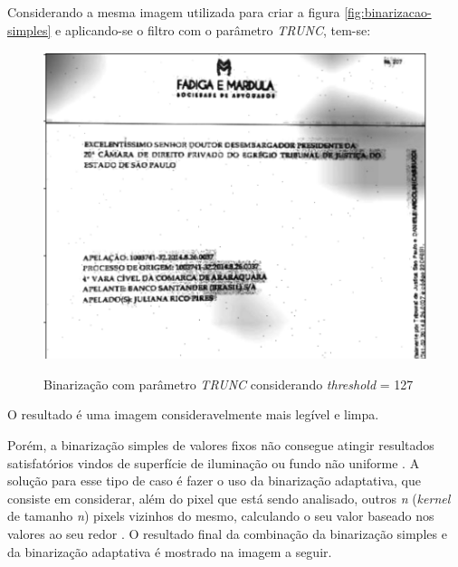 Considerando a mesma imagem utilizada para criar a figura \ref{fig:binarizacao-simples} e aplicando-se o filtro com o parâmetro \textit{TRUNC}, tem-se:

\begin{figure}[H]
  \centering
  \caption{Binarização com parâmetro \textit{TRUNC} considerando \textit{threshold} = 127}
  \includegraphics[scale=.7]{figuras/binarizacao-simples-trunc.png}
  \label{fig:binarizacao-simples-trunc}
\end{figure}

O resultado é uma imagem consideravelmente mais legível e limpa.

Porém, a binarização simples de valores fixos não consegue atingir resultados satisfatórios vindos de superfície de iluminação ou fundo não uniforme \cite{adaptative-threshold-surfaces}. A solução para esse tipo de caso é fazer o uso da binarização adaptativa, que consiste em considerar, além do pixel que está sendo analisado, outros \textit{n} (\textit{kernel} de tamanho \textit{n}) pixels vizinhos do mesmo, calculando o seu valor baseado nos valores ao seu redor \cite{adaptative-threshold-surfaces}. O resultado final da combinação da binarização simples e da binarização adaptativa é mostrado na imagem a seguir.


